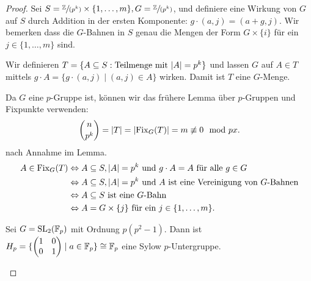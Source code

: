 \begin{proof}
	Sei $S = \sfrac{\mathbb{Z}}{(p^{k})} \times \{1,\ldots,m\}, G =  \sfrac{\mathbb{Z}}{(p^{k})}$, und definiere eine Wirkung von $G$ auf $S$ durch Addition 
	in der ersten Komponente: $g \cdot (a,j) = (a+g,j)$.
	Wir bemerken dass die $G$-Bahnen in $S$ genau die Mengen der Form $G \times \{i\}$ für ein $j \in \{1,\ldots,m\} $ sind.

	Wir definieren $T = \{A \subseteq S: \text{Teilmenge mit } \abs{A} = p^{k}\}$ und
	lassen $G$ auf $A \in T$ mittels $g \cdot A = \{g \cdot (a,j) \mid (a,j) \in A\} $ wirken.
	Damit ist $T $ eine $G$-Menge.

	Da $G$ eine $p$-Gruppe ist, können wir das frühere Lemma über $p$-Gruppen und Fixpunkte verwenden:
	\[
		\binom{n}{p^{k}} = \abs{T} = \abs{\operatorname{Fix}_{G}(T)} = m \not\equiv 0 \mod p
	x.\] 
	nach Annahme im Lemma.
	\begin{align*}
		A \in \on{Fix}_{G}(T) &\Leftrightarrow A \subseteq S, \abs{A} = p^{k} \text{ und } g \cdot A = A \text{ für alle } g \in G\\
							  &\Leftrightarrow A \subseteq S, \abs{A} = p^{k} \text{ und } A \text{ ist eine Vereinigung von $G$-Bahnen} \\%
							  &\Leftrightarrow A \subseteq S \text{ ist eine $G$-Bahn}\\
							  &\Leftrightarrow A = G \times \{j\} \text{ für ein } j \in \{1,\ldots,m\} 
	.\end{align*}
	\begin{eg}
		Sei $G = \operatorname{SL}_{2}(\mathbb{F}_{p})$ mit Ordnung $p(p^2-1)$. Dann ist $H_{p} = \{ \begin{pmatrix} 
				1 & 0\\ 0 &1
		\end{pmatrix} \mid a \in \mathbb{F}_{p} \} \cong \mathbb{F}_{p}$ eine Sylow $p$-Untergruppe.
	\end{eg}
\end{proof}

